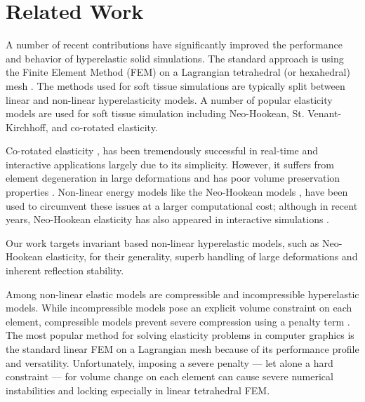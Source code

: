 \chapter{Related Work}
\label{ch:Related Work}

A number of recent contributions have significantly improved the
performance and behavior of hyperelastic solid simulations.  The
standard approach is using the Finite Element Method (FEM) on a
Lagrangian tetrahedral (or hexahedral) mesh \cite{Sifakis:2012}.  The
methods used for soft tissue simulations are typically split between
linear and non-linear hyperelasticity models.  A number of popular
elasticity models are used for soft tissue simulation including
Neo-Hookean, St. Venant-Kirchhoff, and co-rotated elasticity.

Co-rotated elasticity \cite{Muller:2002,McAdams:2011}, has been tremendously successful in real-time
and interactive applications largely due to its simplicity.  However, it suffers from element
degeneration in large deformations \cite{Civit:2014} and has poor volume preservation properties
\cite{Smith:2018}.  Non-linear energy models like the Neo-Hookean models \cite{BonetWood:2008}, have
been used to circumvent these issues at a larger computational cost; although in recent years,
Neo-Hookean elasticity has also appeared in interactive simulations \cite{Liu:2017}.

Our work targets invariant based non-linear hyperelastic models, such as Neo-Hookean elasticity, for
their generality, superb handling of large deformations and inherent reflection stability.

Among non-linear elastic models are compressible and incompressible hyperelastic models. While
incompressible models \cite{Mooney:1940,Rivlin:1948} pose an explicit volume constraint on each
element, compressible models prevent severe compression using a penalty term \cite{BonetWood:2008}.
The most popular method for solving elasticity problems in computer graphics is the standard linear
FEM on a Lagrangian mesh because of its performance profile and versatility.
Unfortunately, imposing a severe penalty --- let alone a hard constraint --- for volume change on
each element can cause severe numerical instabilities and locking especially in linear tetrahedral FEM.

